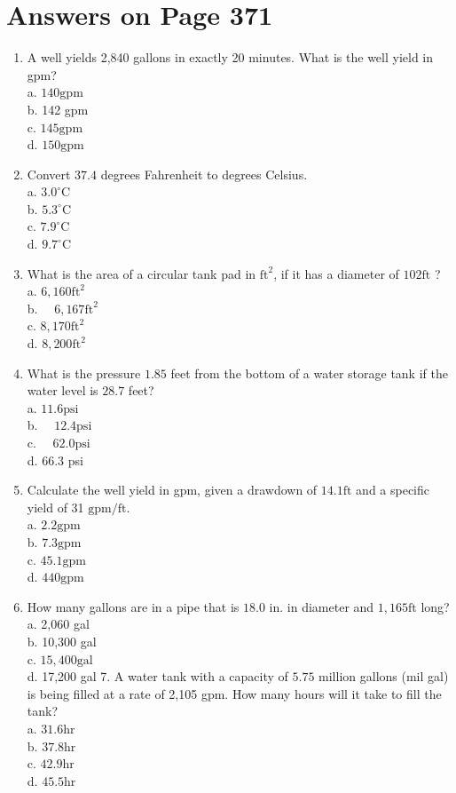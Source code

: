 \documentclass[10pt]{article}
\begin{document}
\section{Answers on Page 371}
\begin{enumerate}
  \item A well yields 2,840 gallons in exactly 20 minutes. What is the well yield in gpm?\\
a. $140 \mathrm{gpm}$\\
b. 142 gpm\\
c. $145 \mathrm{gpm}$\\
d. $150 \mathrm{gpm}$

  \item Convert $37.4$ degrees Fahrenheit to degrees Celsius.\\
a. $3.0^{\circ} \mathrm{C}$\\
b. $5.3^{\circ} \mathrm{C}$\\
c. $7.9^{\circ} \mathrm{C}$\\
d. $9.7^{\circ} \mathrm{C}$

  \item What is the area of a circular tank pad in $\mathrm{ft}^{2}$, if it has a diameter of $102 \mathrm{ft}$ ?\\
a. $6,160 \mathrm{ft}^{2}$\\
b. $\quad 6,167 \mathrm{ft}^{2}$\\
c. $8,170 \mathrm{ft}^{2}$\\
d. $8,200 \mathrm{ft}^{2}$

  \item What is the pressure $1.85$ feet from the bottom of a water storage tank if the water level is $28.7$ feet?\\
a. $11.6 \mathrm{psi}$\\
b. $\quad 12.4 \mathrm{psi}$\\
c. $\quad 62.0 \mathrm{psi}$\\
d. $66.3$ psi

  \item Calculate the well yield in gpm, given a drawdown of $14.1 \mathrm{ft}$ and a specific yield of 31 $\mathrm{gpm} / \mathrm{ft}$.\\
a. $2.2 \mathrm{gpm}$\\
b. $7.3 \mathrm{gpm}$\\
c. $45.1 \mathrm{gpm}$\\
d. $440 \mathrm{gpm}$

  \item How many gallons are in a pipe that is $18.0$ in. in diameter and $1,165 \mathrm{ft}$ long?\\
a. 2,060 gal\\
b. 10,300 gal\\
c. $15,400 \mathrm{gal}$\\
d. 17,200 gal 7. A water tank with a capacity of $5.75$ million gallons (mil gal) is being filled at a rate of 2,105 gpm. How many hours will it take to fill the tank?\\
a. $31.6 \mathrm{hr}$\\
b. $37.8 \mathrm{hr}$\\
c. $42.9 \mathrm{hr}$\\
d. $45.5 \mathrm{hr}$


\end{enumerate}
\end{document}
